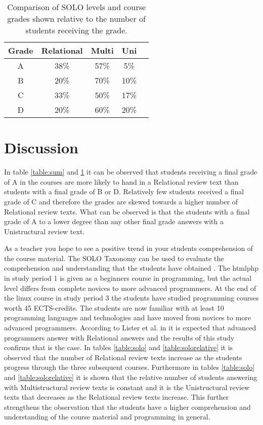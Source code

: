 \documentclass[twoside,twocolumn,a4paper,11pt,english]{article}
\begin{document}
\begin{table}[H]
\caption{Comparison of SOLO levels and course grades shown relative to the number of students receiving the grade.}
\centering
\begin{tabular}{c | c c c c}
Grade & Relational & Multi & Uni \\ [0.5ex] %
\hline
A & 38\% & 57\% & 5\% \\
B & 20\% & 70\% & 10\% \\
C & 33\% & 50\% & 17\% \\
D & 20\% & 60\% & 20\% \\ [1ex]
\end{tabular}
\label{table:percentage}
\end{table}




\section{Discussion}

In table \ref{table:sum} and \ref{table:percentage} it can be observed that students receiving a final grade of A in the courses are more likely to hand in a Relational review text than students with a final grade of B or D. Relatively few students received a final grade of C and therefore the grades are skewed towards a higher number of Relational review texts. What can be observed is that the students with a final grade of A to a lower degree than any other final grade answers with a Unistructural review text.

As a teacher you hope to see a positive trend in your students comprehension of the course material. The SOLO Taxonomy can be used to evaluate the comprehension and understanding that the students have obtained \cite{biggs1982evaluation}. The htmlphp in study period 1 is given as a beginners course in programming, but the actual level differs from complete novices to more advanced programmers. At the end of the linux course in study period 3 the students have studied programming courses worth 45 ECTS-credits. The students are now familiar with at least 10 programming languages and technologies and have moved from novices to more advanced programmers. According to Lister et al. in \cite{lister2006not} it is expected that advanced programmers answer with Relational answers and the results of this study confirms that is the case. In tables \ref{table:solo} and \ref{table:solorelative} it is observed that the number of Relational review texts increase as the students progress through the three subsequent courses. Furthermore in tables \ref{table:solo} and \ref{table:solorelative} it is shown that the relative number of students answering with Multistructural review texts is constant and it is the Unistructural review texts that decreases as the Relational review texts increase. This further strengthens the observation that the students have a higher comprehension and understanding of the course material and programming in general.
\end{document}
